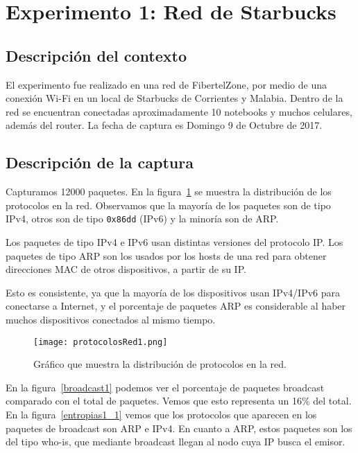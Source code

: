 \section{Experimento 1: Red de Starbucks}

\subsection{Descripción del contexto}

El experimento fue realizado en una red de FibertelZone, por medio de una conexión Wi-Fi en un local de Starbucks de Corrientes y Malabia. Dentro de la red se encuentran conectadas aproximadamente 10 notebooks y muchos celulares, además del router. La fecha de captura es Domingo 9 de Octubre de 2017.

\subsection{Descripción de la captura}

Capturamos 12000 paquetes. En la figura~\ref{protocolos1} se muestra la distribución de los protocolos en la red. Observamos que la mayoría de los paquetes son de tipo IPv4, otros son de tipo \texttt{0x86dd} (IPv6) y la minoría son de ARP.

Los paquetes de tipo IPv4 e IPv6 usan distintas versiones del protocolo IP. Los paquetes de tipo ARP son los usados por los hosts de una red para obtener direcciones MAC de otros dispositivos, a partir de su IP.

Esto es consistente, ya que la mayoría de los dispositivos usan IPv4/IPv6 para conectarse a Internet, y el porcentaje de paquetes ARP es considerable al haber muchos dispositivos conectados al mismo tiempo.

\begin{figure}[H]
\centering
\texttt{[image: protocolosRed1.png]}
\caption{Gráfico que muestra la distribución de protocolos en la red.}
\label{protocolos1}
\end{figure}

En la figura~\ref{broadcast1} podemos ver el porcentaje de paquetes broadcast comparado con el total de paquetes. Vemos que esto representa un 16\% del total. En la figura~\ref{entropias1_1} vemos que los protocolos que aparecen en los paquetes de broadcast son ARP e IPv4. En cuanto a ARP, estos paquetes son los del tipo who-is, que mediante broadcast llegan al nodo cuya IP busca el emisor. 

